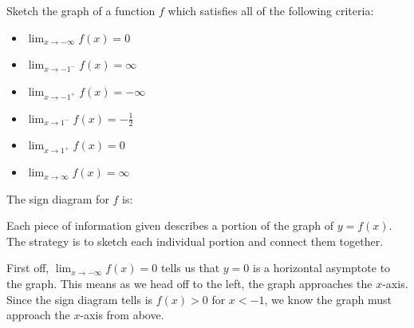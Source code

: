 \documentclass{ximera}
\begin{document}
\begin{example} \label{graphfromlimits} Sketch the graph of a function $f$ which satisfies all of the following criteria:


\begin{itemize}

\item $\lim_{x \rightarrow -\infty} f(x) = 0$

\item $\lim_{x \rightarrow -1^{-}} f(x) = \infty$

\item $\lim_{x \rightarrow -1^{+}} f(x) = - \infty$


\item $\lim_{x \rightarrow 1^{-}} f(x) = -\frac{1}{2}$ 

\item $\lim_{x \rightarrow 1^{+}} f(x) = 0$ 


\item  $\lim_{x \rightarrow \infty } f(x) = \infty$  \\

\end{itemize}

The sign diagram for $f$ is:

\begin{image}
% 
\end{image}



\begin{explanation} Each piece of information given describes a portion of the graph of $y = f(x)$.  The strategy is to sketch each individual portion and connect them together.



First off, $\lim_{x \rightarrow -\infty} f(x) = 0$ tells us that $y = 0$ is a horizontal asymptote to the graph.  This means as we head off to the left, the graph approaches the $x$-axis.  Since the sign diagram tells is $f(x) > 0$ for $x<-1$, we know the graph must approach the $x$-axis from above.




\end{explanation}
\end{example}
\end{document}
